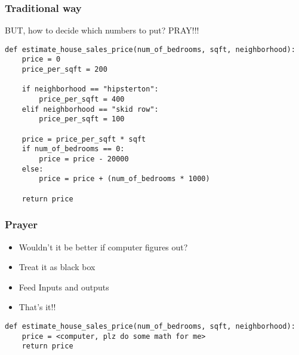 %
%
%
%

\begin{frame}[fragile]\frametitle{Traditional way}
BUT, how to decide which numbers to put? PRAY!!!

\begin{lstlisting}
def estimate_house_sales_price(num_of_bedrooms, sqft, neighborhood):
	price = 0
	price_per_sqft = 200

 	if neighborhood == "hipsterton": 
 		price_per_sqft = 400
	elif neighborhood == "skid row": 
		price_per_sqft = 100
	
	price = price_per_sqft * sqft
	if num_of_bedrooms == 0: 
		price = price - 20000
	else: 
		price = price + (num_of_bedrooms * 1000)
    
	return price
\end{lstlisting}
\end{frame}

\begin{frame}[fragile]\frametitle{Prayer}
	\begin{itemize}
	\item Wouldn't it be better if computer figures out? 
	\item Treat it as black box
	\item Feed Inputs and outputs
	\item That's it!!
	\end{itemize}
\begin{lstlisting}
def estimate_house_sales_price(num_of_bedrooms, sqft, neighborhood):
    price = <computer, plz do some math for me>
    return price
\end{lstlisting}
\end{frame}


